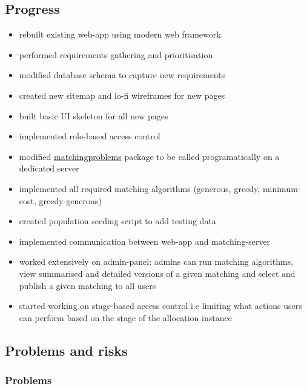 \documentclass[11pt]{article}
\begin{document}
\subsection{Progress}\label{progress}

\begin{itemize}
    \item rebuilt existing web-app using modern web framework
    \item performed requirements gathering and prioritisation
    \item modified database schema to capture new requirements
    \item created new sitemap and lo-fi wireframes for new pages
    \item built basic UI skeleton for all new pages
    \item implemented role-based access control
    \item modified \href{https://github.com/fmcooper/matchingproblems}{matchingproblems} package to be called programatically on a dedicated server
    \item implemented all required matching algorithms (generous, greedy, minimum-cost, greedy-generous)
    \item created population seeding script to add testing data
    \item implemented communication between web-app and matching-server
    \item worked extensively on admin-panel: admins can run matching algorithms, view summarised and detailed versions of a given matching and select and publish a given matching to all users
    \item started working on stage-based access control i.e limiting what actions users can perform based on the stage of the allocation instance
\end{itemize}


\subsection{Problems and risks}\label{problems-and-risks}

\subsubsection{Problems}\label{problems}
\end{document}
